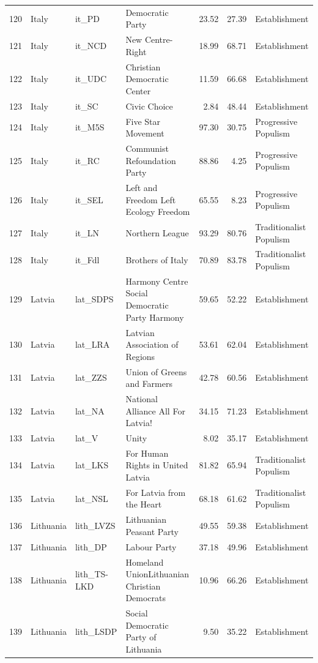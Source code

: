 \begin{landscape}
\begin{longtable}[c]{@{\extracolsep{\fill}}rlllrrl}
  120 & Italy & it\_PD & Democratic Party & 23.52 & 27.39 & Establishment \\ 
  121 & Italy & it\_NCD & New Centre-Right & 18.99 & 68.71 & Establishment \\ 
  122 & Italy & it\_UDC & Christian Democratic Center & 11.59 & 66.68 & Establishment \\ 
  123 & Italy & it\_SC & Civic Choice & 2.84 & 48.44 & Establishment \\ 
  124 & Italy & it\_M5S & Five Star Movement & 97.30 & 30.75 & Progressive Populism \\ 
  125 & Italy & it\_RC & Communist Refoundation Party & 88.86 & 4.25 & Progressive Populism \\ 
  126 & Italy & it\_SEL & Left and Freedom Left Ecology Freedom & 65.55 & 8.23 & Progressive Populism \\ 
  127 & Italy & it\_LN & Northern League & 93.29 & 80.76 & Traditionalist Populism \\ 
  128 & Italy & it\_Fdl & Brothers of Italy & 70.89 & 83.78 & Traditionalist Populism \\ 
  129 & Latvia & lat\_SDPS & Harmony Centre Social Democratic Party Harmony & 59.65 & 52.22 & Establishment \\ 
  130 & Latvia & lat\_LRA & Latvian Association of Regions & 53.61 & 62.04 & Establishment \\ 
  131 & Latvia & lat\_ZZS & Union of Greens and Farmers & 42.78 & 60.56 & Establishment \\ 
  132 & Latvia & lat\_NA & National Alliance All For Latvia! & 34.15 & 71.23 & Establishment \\ 
  133 & Latvia & lat\_V & Unity & 8.02 & 35.17 & Establishment \\ 
  134 & Latvia & lat\_LKS & For Human Rights in United Latvia & 81.82 & 65.94 & Traditionalist Populism \\ 
  135 & Latvia & lat\_NSL & For Latvia from the Heart & 68.18 & 61.62 & Traditionalist Populism \\ 
  136 & Lithuania & lith\_LVZS & Lithuanian Peasant Party & 49.55 & 59.38 & Establishment \\ 
  137 & Lithuania & lith\_DP & Labour Party & 37.18 & 49.96 & Establishment \\ 
  138 & Lithuania & lith\_TS-LKD & Homeland UnionLithuanian Christian Democrats & 10.96 & 66.26 & Establishment \\ 
  139 & Lithuania & lith\_LSDP & Social Democratic Party of Lithuania & 9.50 & 35.22 & Establishment \\ 

\end{longtable}
\end{landscape}
